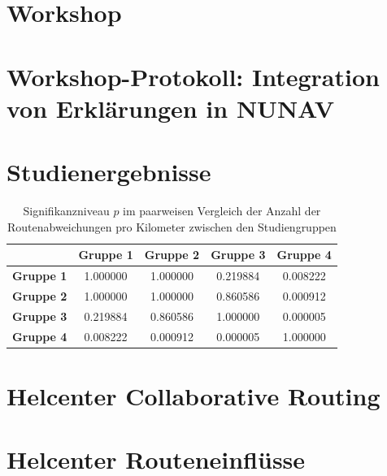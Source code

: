 \section{Workshop}

\section{Workshop-Protokoll: Integration von Erklärungen in NUNAV}
\label{sec:appendix_workshop_protocol}

\section{Studienergebnisse}
\label{sec:appendix_study_results}

\begin{table}
    \begin{center}
        \begin{tabular}{|c|c|c|c|c|}
            \hline
            & \textbf{Gruppe 1} & \textbf{Gruppe 2} & \textbf{Gruppe 3} & \textbf{Gruppe 4} \\ \hline
            \textbf{Gruppe 1}   & 1.000000 & 1.000000 & 0.219884 & 0.008222 \\ \hline
            \textbf{Gruppe 2}   & 1.000000 & 1.000000 & 0.860586 & 0.000912 \\ \hline
            \textbf{Gruppe 3}   & 0.219884 & 0.860586 & 1.000000 & 0.000005 \\ \hline
            \textbf{Gruppe 4}   & 0.008222 & 0.000912 & 0.000005 & 1.000000 \\ \hline
        \end{tabular}
    \end{center}
    
    \caption{Signifikanzniveau $ p $ im paarweisen Vergleich der Anzahl der Routenabweichungen pro Kilometer zwischen den Studiengruppen }
    \label{tab:study_offroute_significance_results}
\end{table}

\section{Helcenter Collaborative Routing}
\label{sec:help_center_collaboratrive_routing}


\section{Helcenter Routeneinflüsse}
\label{sec:help_center_routing_data}


